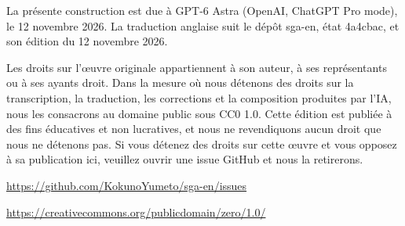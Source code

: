 La présente construction est due à GPT-6 Astra (OpenAI, ChatGPT Pro mode), le 12 novembre 2026. La traduction anglaise suit le dépôt sga-en, état 4a4cbac, et son édition du 12 novembre 2026.\par\medskip
Les droits sur l'œuvre originale appartiennent à son auteur, à ses représentants ou à ses ayants droit. Dans la mesure où nous détenons des droits sur la transcription, la traduction, les corrections et la composition produites par l'IA, nous les consacrons au domaine public sous CC0 1.0. Cette édition est publiée à des fins éducatives et non lucratives, et nous ne revendiquons aucun droit que nous ne détenons pas. Si vous détenez des droits sur cette œuvre et vous opposez à sa publication ici, veuillez ouvrir une issue GitHub et nous la retirerons.\par
\medskip\noindent\url{https://github.com/KokunoYumeto/sga-en/issues}
\par\noindent\url{https://creativecommons.org/publicdomain/zero/1.0/}
\par\endgroup\clearpage
